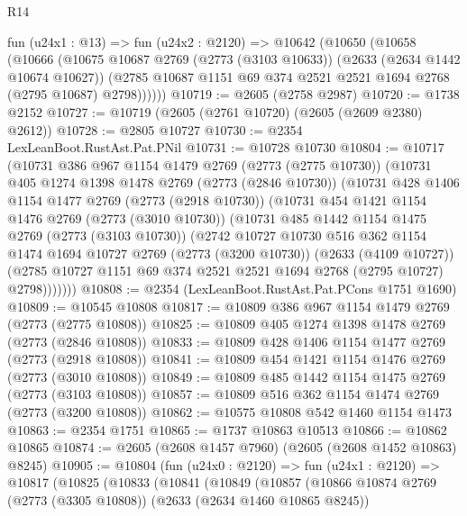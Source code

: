 \begin{lexlean}{R14}
\begin{coremodule}
    fun (u24x1 : @13) =>
    fun (u24x2 : @2120) =>
    @10642
      (@10650
        (@10658
          (@10666
            (@10675
              @10687
              @2769
              (@2773 (@3103 @10633))
              (@2633 (@2634 @1442 @10674 @10627))
              (@2785 @10687 @1151 @69 @374 @2521 @2521 @1694 @2768 (@2795 @10687) @2798))))))
@10719 := @2605 (@2758 @2987)
@10720 := @1738 @2152
@10727 := @10719 (@2605 (@2761 @10720) (@2605 (@2609 @2380) @2612))
@10728 := @2805 @10727
@10730 := @2354 LexLeanBoot.RustAst.Pat.PNil
@10731 := @10728 @10730
@10804 := @10717
    (@10731
      @386
      @967
      @1154
      @1479
      @2769
      (@2773 (@2775 @10730))
      (@10731
        @405
        @1274
        @1398
        @1478
        @2769
        (@2773 (@2846 @10730))
        (@10731
          @428
          @1406
          @1154
          @1477
          @2769
          (@2773 (@2918 @10730))
          (@10731
            @454
            @1421
            @1154
            @1476
            @2769
            (@2773 (@3010 @10730))
            (@10731
              @485
              @1442
              @1154
              @1475
              @2769
              (@2773 (@3103 @10730))
              (@2742
                @10727
                @10730
                @516
                @362
                @1154
                @1474
                @1694
                @10727
                @2769
                (@2773 (@3200 @10730))
                (@2633 (@4109 @10727))
                (@2785 @10727 @1151 @69 @374 @2521 @2521 @1694 @2768 (@2795 @10727) @2798)))))))
@10808 := @2354 (LexLeanBoot.RustAst.Pat.PCons @1751 @1690)
@10809 := @10545 @10808
@10817 := @10809 @386 @967 @1154 @1479 @2769 (@2773 (@2775 @10808))
@10825 := @10809 @405 @1274 @1398 @1478 @2769 (@2773 (@2846 @10808))
@10833 := @10809 @428 @1406 @1154 @1477 @2769 (@2773 (@2918 @10808))
@10841 := @10809 @454 @1421 @1154 @1476 @2769 (@2773 (@3010 @10808))
@10849 := @10809 @485 @1442 @1154 @1475 @2769 (@2773 (@3103 @10808))
@10857 := @10809 @516 @362 @1154 @1474 @2769 (@2773 (@3200 @10808))
@10862 := @10575 @10808 @542 @1460 @1154 @1473
@10863 := @2354 @1751
@10865 := @1737 @10863 @10513
@10866 := @10862 @10865
@10874 := @2605 (@2608 @1457 @7960) (@2605 (@2608 @1452 @10863) @8245)
@10905 := @10804
    (fun (u24x0 : @2120) =>
    fun (u24x1 : @2120) =>
    @10817
      (@10825
        (@10833
          (@10841
            (@10849
              (@10857
                (@10866
                  @10874
                  @2769
                  (@2773 (@3305 @10808))
                  (@2633 (@2634 @1460 @10865 @8245))

\end{coremodule}
\end{lexlean}
